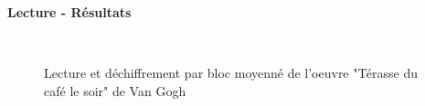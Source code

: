 \documentclass{beamer}
\begin{document}
\begin{frame}[t]
\begin{columns}[t]
\begin{column}{.49\linewidth}
\begin{block}{\centering \textbf{Lecture - Résultats}}
\begin{figure}[t]
\begin{center}
                            \hspace{.05\linewidth}
                            \\
                            \caption{Lecture et déchiffrement par bloc moyenné de l'oeuvre "Térasse du café le soir" de Van Gogh}
                        \end{center}
                    \end{figure}
                \end{block}

                \vspace{1cm}



\end{column}
\end{columns}
\end{frame}
\end{document}
